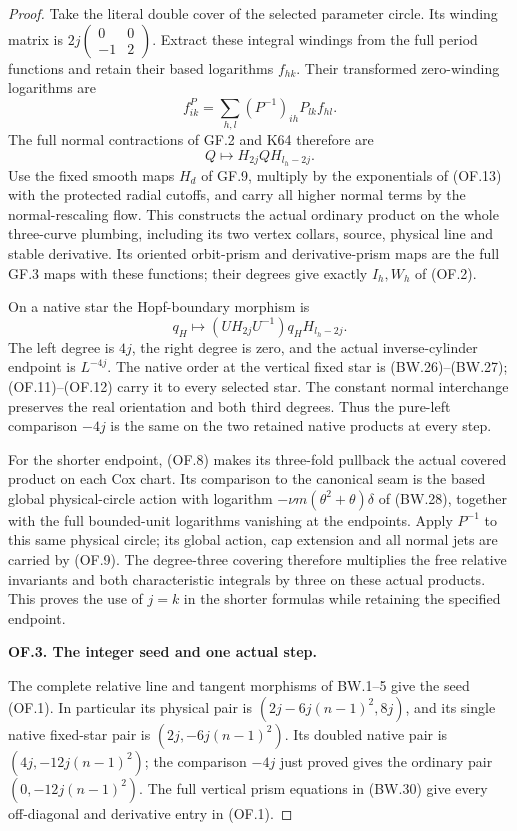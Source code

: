 \begin{proof}
Take the literal double cover of the selected parameter
circle. Its winding matrix is
\(2j\left(\begin{smallmatrix}0&0\\-1&2\end{smallmatrix}\right)\).
Extract these integral windings from the full period functions
and retain their based logarithms \(f_{hk}\). Their transformed
zero-winding logarithms are
\[
                    f^P_{ik}=\sum_{h,l}(P^{-1})_{ih}P_{lk}f_{hl}.
 \tag{OF.13}
\]
The full normal contractions of GF.2 and K64 therefore are
\[
                          Q\longmapsto H_{2j}QH_{l_h-2j}.
 \tag{OF.14}
\]
Use the fixed smooth maps \(H_d\) of GF.9, multiply by the
exponentials of (OF.13) with the protected radial cutoffs,
and carry all higher normal terms by the normal-rescaling
flow. This constructs the actual ordinary product on the
whole three-curve plumbing, including its two vertex collars,
source, physical line and stable derivative. Its oriented
orbit-prism and derivative-prism maps are the full GF.3
maps with these functions; their degrees give exactly
\(I_h,W_h\) of (OF.2).

On a native star the Hopf-boundary morphism is
\[
             q_H\longmapsto (UH_{2j}U^{-1})q_HH_{l_h-2j}.
 \tag{OF.15}
\]
The left degree is \(4j\), the right degree is zero, and
the actual inverse-cylinder endpoint is \(L^{-4j}\).
The native order at the vertical fixed star is (BW.26)--(BW.27);
(OF.11)--(OF.12) carry it to every selected star. The constant
normal interchange preserves the real orientation and both
third degrees. Thus the pure-left comparison \(-4j\) is
the same on the two retained native products at every step.

For the shorter endpoint, (OF.8) makes its three-fold
pullback the actual covered product on each Cox chart.
Its comparison to the canonical seam is the based global
physical-circle action with logarithm
\(-\nu m(\theta^2+\theta)\delta\) of (BW.28), together with
the full bounded-unit logarithms vanishing at the endpoints.
Apply \(P^{-1}\) to this same physical circle; its global
action, cap extension and all normal jets are carried by
(OF.9). The degree-three covering therefore multiplies
the free relative invariants and both characteristic
integrals by three on these actual products. This proves
the use of \(j=k\) in the shorter formulas while retaining
the specified endpoint.

\par\medskip\noindent\textbf{OF.3. The integer seed and one actual step.}\par\nopagebreak[4]
The complete relative line and tangent morphisms of BW.1--5
give the seed (OF.1). In particular its physical pair is
\((2j-6j(n-1)^2,8j)\), and its single native fixed-star
pair is \((2j,-6j(n-1)^2)\). Its doubled native pair is
\((4j,-12j(n-1)^2)\); the comparison \(-4j\) just proved
gives the ordinary pair \((0,-12j(n-1)^2)\).
The full vertical prism equations in (BW.30) give every
off-diagonal and derivative entry in (OF.1).


\end{proof}
